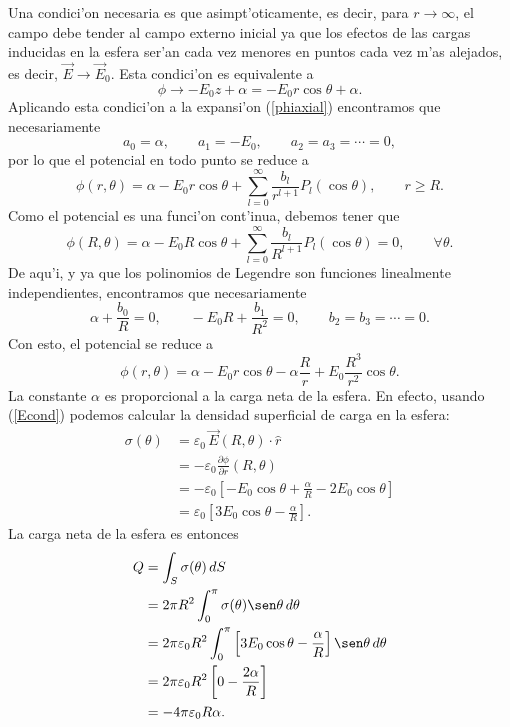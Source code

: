 Una condici'on necesaria es que asimpt'oticamente, es decir, para $r\to\infty$, el campo debe tender al campo externo inicial ya que los efectos de las cargas inducidas en la esfera ser'an cada vez menores en puntos cada vez m'as alejados, es decir, $\vec{E}\to\vec{E}_0 $. Esta condici'on es equivalente a 
\begin{equation}
\phi\to -E_0z+\alpha=-E_0r\cos\theta+\alpha .
\end{equation}
Aplicando esta condici'on a la expansi'on (\ref{phiaxial}) encontramos que necesariamente
\begin{equation}
a_0=\alpha, \qquad a_1=-E_0, \qquad a_2=a_3=\cdots =0,
\end{equation}
por lo que el potencial en todo punto se reduce a 
\begin{equation}
\phi(r,\theta)=\alpha -E_0 r\cos\theta +
\sum_{l=0}^\infty\frac{b_l}{r^{l+1}}P_l(\cos\theta), \qquad r\ge R.
\end{equation}
Como el potencial es una funci'on cont'inua, debemos tener que
\begin{equation}
\phi(R,\theta)=\alpha -E_0 R\cos\theta +
\sum_{l=0}^\infty\frac{b_l}{R^{l+1}}P_l(\cos\theta)=0, \qquad \forall \theta.
\end{equation}
De aqu'i, y ya que los polinomios de Legendre son funciones linealmente independientes, encontramos que necesariamente
\begin{equation}
\alpha+\frac{b_0}{R}=0, \qquad -E_0R+\frac{b_1}{R^2}=0, \qquad b_2=b_3=\cdots =0.
\end{equation}
Con esto, el potencial se reduce a
\begin{equation}\label{phialpha}
\phi(r,\theta)=\alpha -E_0 r\cos\theta -\alpha\frac{R}{r}+E_0 \frac{R^3}{r^2}\cos\theta. 
\end{equation}
La constante $\alpha$ es proporcional a la carga neta de la esfera. En efecto, usando (\ref{Econd}) podemos calcular la densidad superficial de carga en la esfera:
\begin{align}
\sigma(\theta) &= \varepsilon_0\, \vec{E}(R,\theta)\cdot\hat{r} \\
&= -\varepsilon_0 \frac{\partial\phi}{\partial r}(R,\theta) \\
&= -\varepsilon_0\left[-E_0\cos\theta+\frac{\alpha}{R}-2E_0\cos\theta\right]\\
&= \varepsilon_0\left[3E_0\cos\theta-\frac{\alpha}{R}\right].
\end{align}
La carga neta de la esfera es entonces
\begin{align}
Q &= \int_S\sigma(\theta)\,dS \\
&= 2\pi R^2 \int_0^\pi \sigma(\theta)\sen\theta\,d\theta \\
&= 2\pi \varepsilon_0R^2 \int_0^\pi \left[3E_0\cos\theta-\frac{\alpha}{R}\right] \sen\theta\,d\theta \\
&= 2\pi \varepsilon_0R^2 \left[ 0-\frac{2\alpha}{R}\right] \\
&= -4\pi \varepsilon_0R \alpha .
\end{align}
